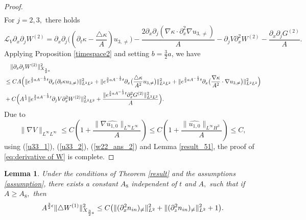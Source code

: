\documentclass[12pt, reqno]{amsart}
\newtheorem{lemma}{Lemma}[section]
\numberwithin{equation}{section}
\begin{document}
\begin{proof}
\begin{equation}
\begin{aligned}
			\end{aligned}
		\end{equation}
		For $j=2,3,$ there holds 
		$$\mathcal{L}_V\partial_x\partial_jW^{(2)}
		=\partial_x\partial_j\Big((\partial_t\kappa-\frac{\triangle\kappa}{A})u_{3,\neq}\Big)
		-\frac{2\partial_x\partial_j
			(\nabla\kappa\cdot\partial_x^2\nabla u_{3,\neq})}{A}
		-\partial_jV\partial_x^2W^{(2)}-\frac{\partial_x\partial_jG^{(2)}}{A}.$$
		Applying Proposition \ref{timespace2} and setting $b=\frac32a$, we have 
		\begin{equation*}\label{w22_ans_3}
			\begin{aligned}
				&\quad\|\partial_x\partial_jW^{(2)}\|^2_{X_{\frac32a}}\\
				&\leq CA\Big(\|{\rm e}^{\frac32aA^{-\frac{1}{3}}t}
				\partial_x(\partial_t\kappa u_{3,\neq})\|^2_{L^2L^2}
				+\|{\rm e}^{\frac32aA^{-\frac{1}{3}}t}
				\partial_x\big(\frac{{\triangle\kappa}}{A^2}u_{3,\neq}\big)\|^2_{L^2L^2}
				+\|{\rm e}^{\frac32aA^{-\frac{1}{3}}t}\partial_x
				\big(\frac{\nabla\kappa}{A^2}\cdot\nabla u_{3,\neq}\big)\|^2_{L^2L^2}\Big)\\
				&+C\Big(A^{\frac{1}{3}}\|{\rm e}^{\frac32aA^{-\frac{1}{3}}t}
				\partial_jV\partial_x^2W^{(2)}\|^2_{L^2L^2}
				+\frac{\|{\rm e}^{\frac32aA^{-\frac{1}{3}}t}
					\partial_x^2 G^{(2)}\|^2_{L^2L^2}}{A}\Big).
			\end{aligned}
		\end{equation*}
		Due to 
		\begin{equation}\label{v1}
			\|\nabla V\|_{L^{\infty}L^{\infty}}\leq C(1+\frac{\|\nabla\widehat{u_{1,0}}\|_{L^{\infty}L^{\infty}}}{A})
			\leq C(1+\frac{\|\widehat{u_{1,0}}\|_{L^{\infty}H^3}}{A})\leq C,
		\end{equation}
		using (\ref{u33_1}), (\ref{u33_2}), (\ref{w22_ans_2}) and Lemma \ref{result_51}, the proof of \eqref{eq:derivative of W} is complete.
		
	\end{proof}
	\begin{lemma}\label{lemmaw22}
		Under the conditions of Theorem \ref{result} and the assumptions \eqref{assumption}, there exists a constant $A_8$ independent of $t$ and $A,$ such that 
		if $A\geq A_8,$ then 
		\begin{equation*}
			A^{\frac32\epsilon}\|\triangle W^{(1)}\|^2_{X_{\frac32a}}\leq C\big(\|(\partial_x^2n_{\rm in})_{\neq}\|^2_{L^2}
			+\|(\partial_z^2n_{\rm in})_{\neq}\|^2_{L^2}+1\big).
		\end{equation*}
	\end{lemma}
\end{document}
